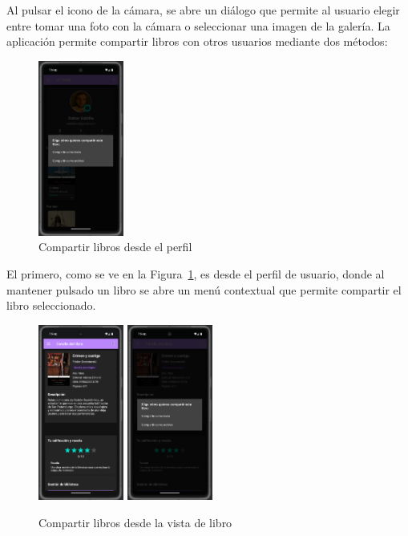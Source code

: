 \documentclass[a4paper,11pt]{report}
\begin{document}
      Al pulsar el icono de la cámara, se abre un diálogo que permite al usuario elegir entre tomar una foto con la cámara o seleccionar una imagen de la galería.
      La aplicación permite compartir libros con otros usuarios mediante dos métodos:
      \begin{figure}[H]
        \centering
        \includegraphics[width=0.25\textwidth]{.img/compartir_perfil.png}
        \caption{Compartir libros desde el perfil}
        \label{fig:compartir-perfil}
      \end{figure}
      El primero, como se ve en la Figura~\ref{fig:compartir-perfil}, es desde el perfil de usuario, donde al mantener pulsado un libro se abre un menú contextual que permite compartir el libro seleccionado.
      \begin{figure}[H]
        \centering
        \includegraphics[width=0.25\textwidth]{.img/compartir_libro_1.png}
        \hspace{2cm}
        \includegraphics[width=0.25\textwidth]{.img/compartir_libro_2.png}
        \caption{Compartir libros desde la vista de libro}
        \label{fig:compartir-libro}
      \end{figure}
\end{document}
